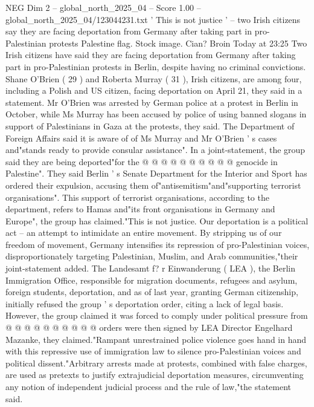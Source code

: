 \begin{textsample}{NEG Dim 2 – global\_north\_2025\_04 – Score 1.00 – global\_north\_2025\_04/123044231.txt}  \label{ex:f2_neg_015}
' This is not justice ' -- two Irish citizens say they are facing deportation from Germany after taking part in pro-Palestinian protests Palestine flag.
Stock image.
Cian?
Broin Today at 23:25 Two Irish citizens have said they are facing deportation from Germany after taking part in pro-Palestinian protests in Berlin, despite having no criminal convictions.
Shane O'Brien ( 29 ) and Roberta Murray ( 31 ), Irish citizens, are among four, including a Polish and US citizen, facing deportation on April 21, they said in a statement.
Mr O'Brien was arrested by German police at a protest in Berlin in October, while Ms Murray has been accused by police of using banned slogans in support of Palestinians in Gaza at the protests, they said.
The Department of Foreign Affairs said it is aware of of Ms Murray and Mr O'Brien ' s cases and"stands ready to provide consular assistance".
In a joint-statement, the group said they are being deported"for the @ @ @ @ @ @ @ @ @ @ genocide in Palestine".
They said Berlin ' s Senate Department for the Interior and Sport has ordered their expulsion, accusing them of"antisemitism"and"supporting terrorist organisations".
This support of terrorist organisations, according to the department, refers to Hamas and"its front organisations in Germany and Europe", the group has claimed."This is not justice.
Our deportation is a political act -- an attempt to intimidate an entire movement.
By stripping us of our freedom of movement, Germany intensifies its repression of pro-Palestinian voices, disproportionately targeting Palestinian, Muslim, and Arab communities,"their joint-statement added.
The Landesamt f? r Einwanderung ( LEA ), the Berlin Immigration Office, responsible for migration documents, refugees and asylum, foreign students, deportation, and as of last year, granting German citizenship, initially refused the group ' s deportation order, citing a lack of legal basis.
However, the group claimed it was forced to comply under political pressure from @ @ @ @ @ @ @ @ @ @ orders were then signed by LEA Director Engelhard Mazanke, they claimed."Rampant unrestrained police violence goes hand in hand with this repressive use of immigration law to silence pro-Palestinian voices and political dissent."Arbitrary arrests made at protests, combined with false charges, are used as pretexts to justify extrajudicial deportation measures, circumventing any notion of independent judicial process and the rule of law,"the statement said.

\end{textsample}
